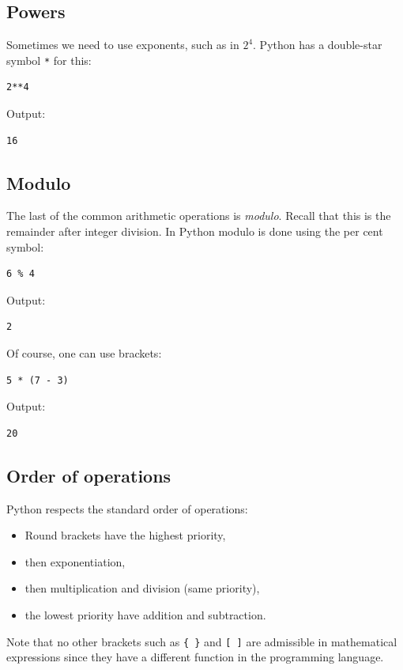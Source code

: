 \subsection{Powers}
Sometimes we need to use exponents, such as in $2^4$. Python has a double-star
symbol {\tt **} for this:

\begin{verbatim}
2**4
\end{verbatim}
Output:

\begin{verbatim}
16
\end{verbatim}
\subsection{Modulo}
The last of the common arithmetic operations is {\em modulo}. Recall that this is the remainder 
after integer division. In Python modulo is done using the per cent symbol:

\begin{verbatim}
6 % 4
\end{verbatim}
Output:

\begin{verbatim}
2
\end{verbatim}
Of course, one can use brackets:

\begin{verbatim}
5 * (7 - 3)
\end{verbatim}
Output:

\begin{verbatim}
20
\end{verbatim}
\subsection{Order of operations}
Python respects the standard order of operations:

\begin{itemize} 
\item Round brackets have the highest priority,
\item then exponentiation, 
\item then multiplication and division (same priority),
\item the lowest priority have addition and subtraction.
\end{itemize}
Note that no other brackets such as {\tt \{ \}} and {\tt [ ]} are 
admissible in mathematical expressions since they have a different 
function in the programming language.

